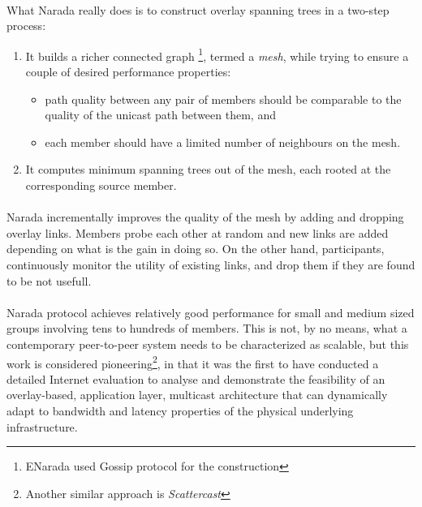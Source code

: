\documentclass[a4paper,10pt]{article}
\begin{document}
\paragraph*{}
What Narada really does is to construct overlay spanning trees in a two-step process:
\begin{enumerate}
  \item It builds a richer connected graph \footnote{ENarada \cite{li_enarada_2008} used Gossip protocol for the construction}, termed a \emph{mesh}, while trying to ensure a couple of desired performance properties:
    \begin{itemize}
      \item path quality between any pair of members should be comparable to the quality of the unicast path between them, and
      \item each member should have a limited number of neighbours on the mesh.
    \end{itemize}

  \item It computes minimum spanning trees out of the mesh, each rooted at the corresponding source member.
\end{enumerate}

\paragraph*{}
Narada incrementally improves the quality of the mesh by adding and dropping overlay links. Members probe each other at random and new links are added depending on what is the gain in doing so. On the other hand, participants, continuously  monitor the utility of existing links, and drop them if they are found to be not usefull.

\paragraph*{}
Narada protocol achieves relatively good performance for small and medium sized groups involving tens to hundreds of members. This is not, by no means, what a contemporary peer-to-peer system needs to be characterized as scalable, but this work is considered pioneering\footnote{Another similar approach is \emph{Scattercast}\cite{chawathe_scattercast_2000}}, in that it was the first to have conducted a detailed Internet evaluation to analyse and demonstrate the feasibility of an overlay-based, application layer, multicast architecture that can dynamically adapt to bandwidth and latency properties of the physical underlying infrastructure.
\end{document}
